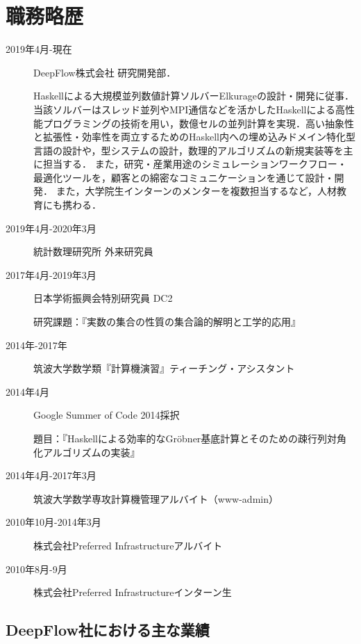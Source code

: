 \documentclass[a4j,draft]{ltjsarticle}
\begin{document}
\section*{職務略歴}
\begin{refsection}
  \newrefcontext[labelprefix={J-}] 
\begin{description}
 \item[2019年4月-現在] DeepFlow株式会社 研究開発部．
 
  Haskellによる大規模並列数値計算ソルバーElkurageの設計・開発に従事．当該ソルバーはスレッド並列やMPI通信などを活かしたHaskellによる高性能プログラミングの技術を用い，数億セルの並列計算を実現．高い抽象性と拡張性・効率性を両立するためのHaskell内への埋め込みドメイン特化型言語の設計や，型システムの設計，数理的アルゴリズムの新規実装等を主に担当する．
  また，研究・産業用途のシミュレーションワークフロー・最適化ツールを，顧客との綿密なコミュニケーションを通じて設計・開発．
  また，大学院生インターンのメンターを複数担当するなど，人材教育にも携わる．

 \item[2019年4月-2020年3月] 統計数理研究所 外来研究員
 \item[2017年4月-2019年3月]
              日本学術振興会特別研究員 DC2

              研究課題：『実数の集合の性質の集合論的解明と工学的応用』
 \item[2014年-2017年] 筑波大学数学類『計算機演習』ティーチング・アシスタント
 \item[2014年4月] Google Summer of Code 2014採択

            題目：『Haskellによる効率的なGr\"{o}bner基底計算とそのための疎行列対角化アルゴリズムの実装』
 \item[2014年4月-2017年3月] 筑波大学数学専攻計算機管理アルバイト（www-admin）
 \item[2010年10月-2014年3月] 株式会社Preferred Infrastructureアルバイト
 \item[2010年8月-9月] 株式会社Preferred Infrastructureインターン生
\end{description}

\subsection*{DeepFlow社における主な業績}


\end{refsection}
\end{document}
